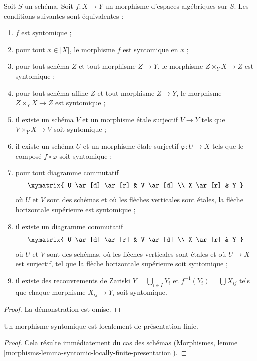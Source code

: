 \begin{lemma}
\label{lemma-syntomic-local}
Soit $S$ un schéma.
Soit $f : X \to Y$ un morphisme d'espaces algébriques sur $S$.
Les conditions suivantes sont équivalentes :
\begin{enumerate}
\item $f$ est syntomique ;
\item pour tout $x \in |X|$, le morphisme $f$ est syntomique en $x$ ;
\item pour tout schéma $Z$ et tout morphisme $Z \to Y$, le morphisme
$Z \times_Y X \to Z$ est syntomique ;
\item pour tout schéma affine $Z$ et tout morphisme
$Z \to Y$, le morphisme $Z \times_Y X \to Z$ est syntomique ;
\item il existe un schéma $V$ et un morphisme étale surjectif
$V \to Y$ tels que $V \times_Y X \to V$ soit syntomique ;
\item il existe un schéma $U$ et un morphisme étale surjectif
$\varphi : U \to X$ tels que le composé $f \circ \varphi$
soit syntomique ;
\item pour tout diagramme commutatif
$$
\xymatrix{
U \ar[d] \ar[r] & V \ar[d] \\
X \ar[r] & Y
}
$$
où $U$ et $V$ sont des schémas et où les flèches verticales sont étales,
la flèche horizontale supérieure est syntomique ;
\item il existe un diagramme commutatif
$$
\xymatrix{
U \ar[d] \ar[r] & V \ar[d] \\
X \ar[r] & Y
}
$$
où $U$ et $V$ sont des schémas, où les flèches verticales sont étales et où
$U \to X$ est surjectif, tel que la flèche horizontale supérieure soit syntomique ;
\item il existe des recouvrements de Zariski $Y = \bigcup_{i \in I} Y_i$
et $f^{-1}(Y_i) = \bigcup X_{ij}$ tels que
chaque morphisme $X_{ij} \to Y_i$ soit syntomique.
\end{enumerate}
\end{lemma}

\begin{proof}
La démonstration est omise.
\end{proof}

\begin{lemma}
\label{lemma-syntomic-locally-finite-presentation}
Un morphisme syntomique est localement de présentation finie.
\end{lemma}

\begin{proof}
Cela résulte immédiatement du cas des schémas
(Morphismes, lemme \ref{morphisms-lemma-syntomic-locally-finite-presentation}).
\end{proof}


